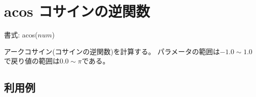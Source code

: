 
%

\section{acos コサインの逆関数\label{sect:acos}}

書式: acos($num$)

アークコサイン(コサインの逆関数)を計算する。
パラメータの範囲は$-1.0\sim 1.0$で戻り値の範囲は$0.0\sim \pi$である。

\subsection*{利用例}


%

